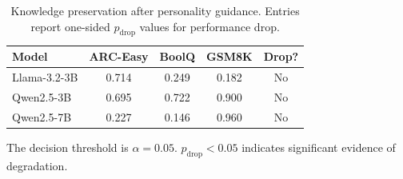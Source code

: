 \begin{table}[htbp]
\centering
\caption{Knowledge preservation after personality guidance. Entries report one-sided $p_{\mathrm{drop}}$ values for performance drop.}
\label{tab:knowledge_preservation}
\begin{tabular}{lcccc}
\toprule
Model & ARC-Easy & BoolQ & GSM8K & Drop? \\
\midrule
Llama-3.2-3B & 0.714 & 0.249 & 0.182 & No \\
Qwen2.5-3B & 0.695 & 0.722 & 0.900 & No \\
Qwen2.5-7B & 0.227 & 0.146 & 0.960 & No \\
\bottomrule
\end{tabular}

\vspace{0.4em}
\footnotesize{The decision threshold is $\alpha = 0.05$. $p_{\mathrm{drop}} < 0.05$ indicates significant evidence of degradation.}
\end{table}
